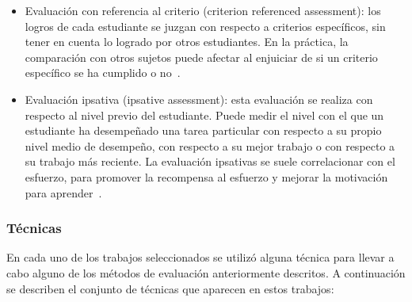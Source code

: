 \begin{itemize}
\item Evaluación con referencia al criterio (criterion referenced assessment): los logros de cada estudiante se juzgan con respecto a criterios específicos, sin tener en cuenta lo logrado por otros estudiantes. En la práctica, la comparación con otros sujetos puede afectar al enjuiciar de si un criterio específico se ha cumplido o no~\cite{dunn2002seeking}.
\item Evaluación ipsativa (ipsative assessment): esta evaluación se realiza con respecto al nivel previo del estudiante. Puede medir el nivel con el que un estudiante ha desempeñado una tarea particular con respecto a su propio nivel medio de desempeño, con respecto a su mejor trabajo o con respecto a su trabajo más reciente. La evaluación ipsativas se suele correlacionar con el esfuerzo, para promover la recompensa al esfuerzo y mejorar la motivación para aprender~\cite{hughes2011towards}.
\end{itemize}

\subsubsection{Técnicas}
\label{sec:techniques}

En cada uno de los trabajos seleccionados se utilizó alguna técnica para llevar a cabo alguno de los métodos de evaluación anteriormente descritos. A continuación se describen el conjunto de técnicas que aparecen en estos trabajos:

